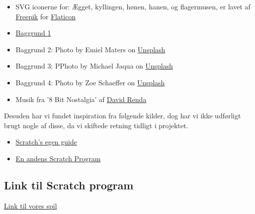\documentclass[12pt,a4paper]{article}
\begin{document}
\begin{itemize}
    \item SVG iconerne for: Ægget, kyllingen, hønen, hanen, og flagermusen, er lavet af \href{https://www.freepik.com}{Freepik} for \href{www.flaticon.com}{Flaticon} 
    \item \href{https://steamcommunity.com/sharedfiles/filedetails/?l=danish&id=346887557}{Baggrund 1} 
    \item Baggrund 2: Photo by Emiel Maters on \href{https://unsplash.com/photos/2prWrSjtIJg?utm_source=unsplash&utm_medium=referral&utm_content=creditShareLink}{Unsplash} 
    \item Baggrund 3: PPhoto by Michael Jaqua on \href{https://unsplash.com/photos/xYgQYKhfUvo?utm_source=unsplash&utm_medium=referral&utm_content=creditShareLink}{Unsplash} 
    \item Baggrund 4: Photo by Zoe Schaeffer on \href{https://unsplash.com/photos/xYgQYKhfUvo?utm_source=unsplash&utm_medium=referral&utm_content=creditShareLink}{Unsplash} 
    \item Musik fra '8 Bit Nostalgia' af \href{https://www.fesliyanstudios.com/royalty-free-music/download/8-bit-nostalgia/2289}{David Renda} 
\end{itemize}
Desuden har vi fundet inspiration fra følgende kilder, dog har vi ikke udførligt brugt nogle af disse, da vi skiftede retning tidligt i projektet.

\begin{itemize}
    \item  \href{https://en.scratch-wiki.info/wiki/Jumping}{Scratch's egen guide}
    \item  \href{https://scratch.mit.edu/projects/635949/editor/}{En andens Scratch Program}
\end{itemize}

\subsection{Link til Scratch program}

    \href{https://scratch.mit.edu/projects/568368631}{Link til vores spil}
\end{document}
